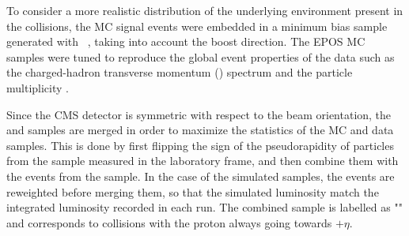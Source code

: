 To consider a more realistic distribution of the underlying environment present in the \pPb collisions, the MC signal events were embedded in a minimum bias sample generated with \EPOS~\cite{EPOS}, taking into account the \pPb boost direction. The EPOS MC samples were tuned to reproduce the global event properties of the \pPb data such as the charged-hadron transverse momentum (\pt) spectrum and the particle multiplicity \cite{dNdEta_pPb}.

Since the CMS detector is symmetric with respect to the beam orientation, the \pPb and \Pbp samples are merged in order to maximize the statistics of the MC and data samples. This is done by first flipping the sign of the pseudorapidity of particles from the \RunPbp sample measured in the laboratory frame, and then combine them with the events from the \RunpPb sample. In the case of the simulated samples, the events are reweighted before merging them, so that the simulated luminosity match the integrated luminosity recorded in each \pPb run. The combined sample is labelled as "\pA" and corresponds to \pPb collisions with the proton always going towards $+\eta$.






